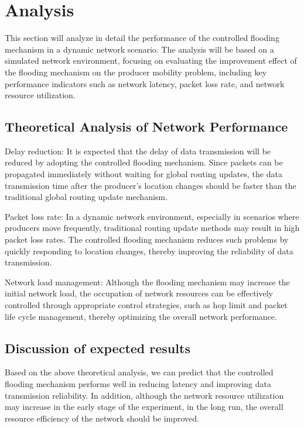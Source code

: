 \documentclass[conference]{IEEEtran}
\begin{document}
\section{Analysis}
This section will analyze in detail the performance of the controlled flooding mechanism in a dynamic network scenario. The analysis will be based on a simulated network environment, focusing on evaluating the improvement effect of the flooding mechanism on the producer mobility problem, including key performance indicators such as network latency, packet loss rate, and network resource utilization.

\subsection{Theoretical Analysis of Network Performance}
Delay reduction: It is expected that the delay of data transmission will be reduced by adopting the controlled flooding mechanism. Since packets can be propagated immediately without waiting for global routing updates, the data transmission time after the producer's location changes should be faster than the traditional global routing update mechanism.

Packet loss rate: In a dynamic network environment, especially in scenarios where producers move frequently, traditional routing update methods may result in high packet loss rates. The controlled flooding mechanism reduces such problems by quickly responding to location changes, thereby improving the reliability of data transmission.

Network load management: Although the flooding mechanism may increase the initial network load, the occupation of network resources can be effectively controlled through appropriate control strategies, such as hop limit and packet life cycle management, thereby optimizing the overall network performance.

\subsection{Discussion of expected results}
Based on the above theoretical analysis, we can predict that the controlled flooding mechanism performs well in reducing latency and improving data transmission reliability. In addition, although the network resource utilization may increase in the early stage of the experiment, in the long run, the overall resource efficiency of the network should be improved.
\end{document}
